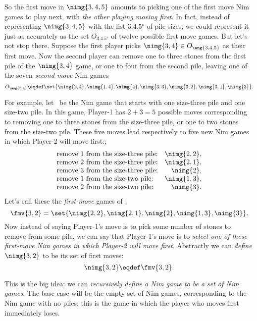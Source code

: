 \begin{definition}
So the first move in $\nimg{3,4,5}$ amounts to picking one of the
first move Nim games to play next, with \emph{the other playing moving
  first}.  In fact, instead of representing $\nimg{3,4,5}$ with the
list $\ang{3,4,5}$ of pile sizes, we could represent it just as
accurately as the set $O_{\ang{3,4,5}}$ of twelve possible first move
games.  But let's not stop there.  Suppose the first player picks
$\nimg{3,4} \in O_{\ang{3,4,5}}$ as their first move.  Now the second
player can remove one to three stones from the first pile of the
$\nimg{3,4}$ game, or one to four from the second pile, leaving one of
  the seven \emph{second move} Nim games
\[
O_{\ang{3,4}} \eqdef \set{\nimg{2,4}, \nimg{1,4}, \nimg{4}, \nimg{3,3},
  \nimg{3,2}, \nimg{3,1}, \nimg{3}}.
\]
\fi

For example, let \ be the Nim game that starts with one
size-three pile and one size-two pile.  In this game, Player-1 has
$2+3 =5$ possible moves corresponding to removing one to three stones
from the size-three pile, or one to two stones from the size-two pile.
These five moves lead respectively to five new Nim games in which Player-2 will move first:;
\[\begin{array}{lr}
\text{remove 1 from the size-three pile:} & \nimg{2, 2},\\
\text{remove 2 from the size-three pile:} & \nimg{2, 1},\\
\text{remove 3 from the size-three pile:} & \nimg{2},\\
\text{remove 1 from the size-two pile:}   & \nimg{1, 3},\\
\text{remove 2 from the size-two pile:}   & \nimg{3}.
\end{array}\]
Let's call these the \emph{first-move} games  of :
\begin{equation}\label{fmvnim32}
\fmv{3,2} = \set{\nimg{2, 2}, \nimg{2, 1}, \nimg{2}, \nimg{1, 3},
  \nimg{3}}.
\end{equation}
Now instead of saying Player-1's move is to pick some number of stones
to remove from some pile, we can say that Player-1's move is to
\emph{select one of these first-move Nim games in which
  Player-2 will move first}.  Abstractly we can \emph{define} $\nimg{3,2}$
to be its set of first moves:
\[
\nimg{3,2} \eqdef \fmv{3,2}.
\]

This is the big idea: we can \emph{recursively define a Nim game to be
  a set of Nim games}.  The base case will be the empty set of Nim
games, corresponding to the Nim game with no piles; this is the game
in which the player who moves first immediately loses.


\end{definition}
